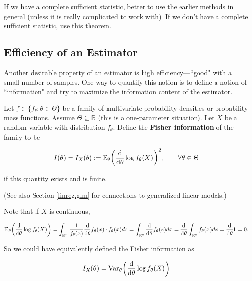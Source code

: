 \begin{remark} If we have a complete sufficient statistic, better to use the earlier methods in general (unless it is really complicated to work with). If we don't have a complete sufficient statistic, use this theorem.

\end{remark}

\subsection{Efficiency of an Estimator}\label{mathstats.eff.est} Another desirable property of an estimator is high efficiency---``good" with a small number of samples. One way to quantify this notion is to define a notion of ``information" and try to maximize the information content of the estimator.

\begin{definition}\label{mathstats.def.fish.inf} Let \(f \in \{f_\theta: \theta \in \Theta \}\) be a family of multivariate probability densities or probability mass functions. Assume \(\Theta \subseteq \mathbb{R}\) (this is a one-parameter situation). Let \(X\) be a random variable with distribution \(f_\theta\). Define the \textbf{Fisher information} of the family to be

\[
I(\theta) = I_X(\theta) := \E_\theta \bigg( \deriv{}{\theta} \log f_\theta (X) \bigg)^2, \qquad \forall \theta \in \Theta
\]

if this quantity exists and is finite.

\end{definition}

(See also Section \ref{linreg.glm} for connections to generalized linear models.)

\begin{remark} Note that if \(X\) is continuous, 

\[
\E_\theta \bigg( \deriv{}{\theta} \log f_\theta (X) \bigg) = \int_{\mathbb{R}^n} \frac{1}{f_\theta(x)} \deriv{}{\theta} f_\theta(x) \cdot f_\theta(x) dx = \int_{\mathbb{R}^n} \deriv{}{\theta} f_\theta(x) dx = \deriv{}{\theta} \int_{\mathbb{R}^n} f_\theta(x) dx = \deriv{}{\theta} 1   = 0.
\]

So we could have equivalently defined the Fisher information as 

\[
I_X(\theta) = \Var_\theta \bigg( \deriv{}{\theta} \log f_\theta (X) \bigg)
\]

\end{remark}

